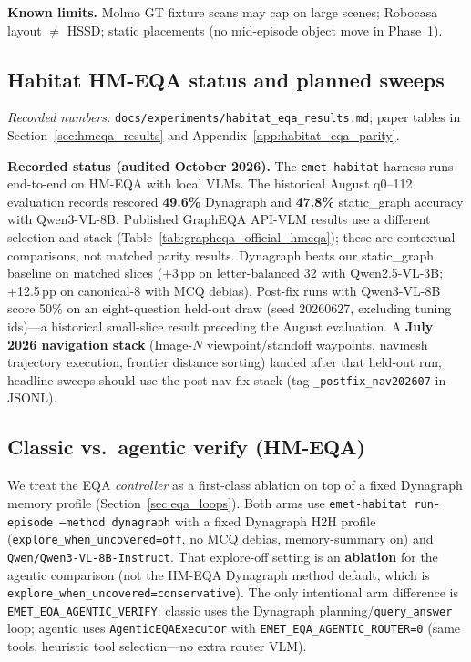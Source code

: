 \textbf{Known limits.}
Molmo GT fixture scans may cap on large scenes; Robocasa layout $\neq$ HSSD; static placements (no mid-episode object move in Phase~1).

\subsection{Habitat HM-EQA status and planned sweeps}
\label{sec:hmeqa_planned}

\textit{Recorded numbers:} \texttt{docs/experiments/habitat\_eqa\_results.md}; paper tables in Section~\ref{sec:hmeqa_results} and Appendix~\ref{app:habitat_eqa_parity}.

\textbf{Recorded status (audited October 2026).}
The \texttt{emet-habitat} harness runs end-to-end on HM-EQA with local VLMs.
The historical August q0--112 evaluation records rescored \textbf{49.6\%} Dynagraph and \textbf{47.8\%} static\_graph accuracy with Qwen3-VL-8B. Published GraphEQA API-VLM results use a different selection and stack (Table~\ref{tab:grapheqa_official_hmeqa}); these are contextual comparisons, not matched parity results.
Dynagraph beats our static\_graph baseline on matched slices (+3\,pp on letter-balanced 32 with Qwen2.5-VL-3B; +12.5\,pp on canonical-8 with MCQ debias).
Post-fix runs with Qwen3-VL-8B score 50\% on an eight-question held-out draw (seed 20260627, excluding tuning ids)---a historical small-slice result preceding the August evaluation.
A \textbf{July 2026 navigation stack} (Image-$N$ viewpoint/standoff waypoints, navmesh trajectory execution, frontier distance sorting) landed after that held-out run; headline sweeps should use the post-nav-fix stack (tag \texttt{\_postfix\_nav202607} in JSONL).

\subsection{Classic vs.\ agentic verify (HM-EQA)}
\label{sec:agentic_h2h}

We treat the EQA \emph{controller} as a first-class ablation on top of a fixed Dynagraph memory profile (Section~\ref{sec:eqa_loops}).
Both arms use \texttt{emet-habitat run-episode --method dynagraph} with a fixed Dynagraph H2H profile (\texttt{explore\_when\_uncovered=off}, no MCQ debias, memory-summary on) and \texttt{Qwen/Qwen3-VL-8B-Instruct}.
That explore-off setting is an \textbf{ablation} for the agentic comparison (not the HM-EQA Dynagraph method default, which is \texttt{explore\_when\_uncovered=conservative}).
The only intentional arm difference is \texttt{EMET\_EQA\_AGENTIC\_VERIFY}: classic uses the Dynagraph planning/\texttt{query\_answer} loop; agentic uses \texttt{AgenticEQAExecutor} with \texttt{EMET\_EQA\_AGENTIC\_ROUTER=0} (same tools, heuristic tool selection---no extra router VLM).

